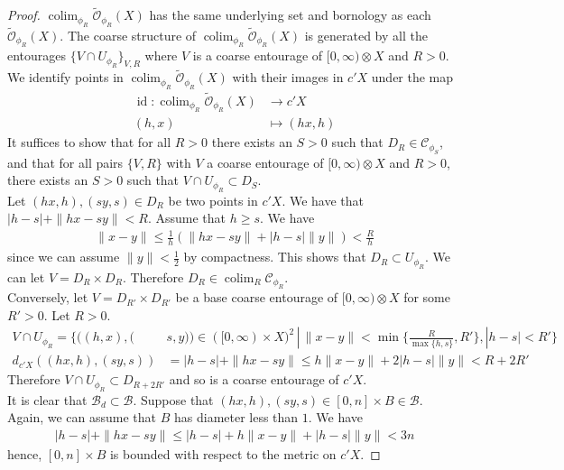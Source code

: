 \documentclass[a4paper,11pt]{article}
\theoremstyle{definition}
\theoremstyle{plain}
\theoremstyle{remark}
\DeclareMathOperator{\id}{id}
\DeclareMathOperator{\colim}{colim}
\begin{document}
\begin{proof} 
$\colim_{\phi_{R}}\tilde{\mathcal{O}}_{\phi_{R}}(X)$ has the same underlying set and bornology as each $\tilde{\mathcal{O}}_{\phi_{R}}(X)$. The coarse structure of $\colim_{\phi_{R}}\tilde{\mathcal{O}}_{\phi_{R}}(X)$ is generated by all the entourages $\{V\cap U_{\phi_{R}}\}_{V,R}$ where $V$ is a coarse entourage of $[0,\infty)\otimes X$ and $R> 0$. \\

We identify points in $\colim_{\phi_{R}}\tilde{\mathcal{O}}_{\phi_{R}}(X)$ with their images in $c'X$ under the map
\begin{align*}
\id: \colim_{\phi_{R}}\tilde{\mathcal{O}}_{\phi_{R}}(X) &\rightarrow c'X\\
(h,x) &\mapsto (hx,h)
\end{align*}
It suffices to show that for all $R>0$ there exists an $S>0$ such that $D_{R}\in \mathcal{C}_{\phi_S}$, and that for all pairs $\{V,R\}$ with $V$ a coarse entourage of $[0,\infty)\otimes X$ and $R>0$, there exists an $S>0$ such that $V\cap U_{\phi_{R}}\subset D_{S}$.\\

Let $(hx,h),(sy,s) \in D_{R}$ be two points in $c'X$. We have that $|h-s|+\|hx-sy\| <R$. Assume that $h\geq s$. We have
\begin{align*}
\|x-y\| \leq \frac{1}{h} (\|hx-sy\| + |h-s|\|y\|) < \frac{R}{h}
\end{align*}
since we can assume $\|y\|<\frac{1}{2}$ by compactness. This shows that $D_{R}\subset U_{\phi_{R}}$. We can let $V = D_{R} \times D_{R}$. Therefore $D_{R}\in \colim_{R} \mathcal{C}_{\phi_{R}} $.\\

Conversely, let $V = D_{R'} \times D_{R'}$ be a base coarse entourage of $[0,\infty) \otimes X$ for some $R'>0$. Let $R>0$. 
\begin{align*}
V\cap U_{\phi_{R}} = \{((h,x),(&s,y))\in ([0,\infty)\times X)^2 \,|\, \|x-y\| < \min\{\frac{R}{\max\{h,s\}}, R'\}, |h-s|< R'\} \\
d_{c'X} ((hx,h),(sy,s)) &= |h-s|+\|hx-sy\| \leq h\|x-y\| + 2|h-s| \|y\| < R+ 2R'
\end{align*}
Therefore $V \cap U_{\phi_R} \subset D_{R+2R'}$ and so is a coarse entourage of $c'X$. \\

It is clear that $\mathcal{B}_{d}\subset \mathcal{B}$. Suppose that $(hx,h),(sy,s)\in [0,n]\times B \in \mathcal{B}$. Again, we can assume that $B$ has diameter less than $1$.  We have
\begin{align*}
|h-s|+\|hx-sy\| \leq |h-s|+h\|x-y\|+|h-s|\|y\| < 3n
\end{align*}
hence, $[0,n] \times B$ is bounded with respect to the metric on $c'X$. 
\end{proof}
\end{document}

